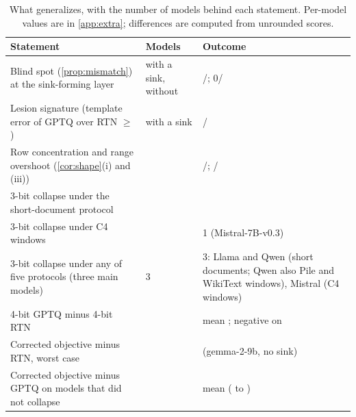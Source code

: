 \begin{table}[t]
\caption{What generalizes, with the number of models behind each statement. Per-model values are in \cref{app:extra}; differences are computed from unrounded scores.}
\label{tab:census}
\begin{center}
\small
\footnotesize\begin{tabular}{p{6.2cm}p{2.6cm}p{4.2cm}}
\toprule
Statement & Models & Outcome \\
\midrule
Blind spot (\cref{prop:mismatch}) at the sink-forming layer & \nSink{} with a sink, \nNoSink{} without & \nSink{}/\nSink{}; 0/\nNoSink{} \\
Lesion signature (template error of GPTQ over RTN $\ge$ \LesionRatioMin{}) & \nSinkStats{} with a sink & \nSinkStats{}/\nSinkStats{} \\
Row concentration and range overshoot (\cref{cor:shape}(i) and (iii)) & \nSinkStats{} & \nRowConc{}/\nSinkStats{}; \nClipOver{}/\nSinkStats{} \\
3-bit collapse under the short-document protocol            & \nCensus{}  & \nCollapse{} \\
3-bit collapse under C4 windows                              & \nWin{}     & 1 (Mistral-7B-v0.3) \\
3-bit collapse under any of five protocols (three main models) & 3 & 3: Llama and Qwen (short documents; Qwen also Pile and WikiText windows), Mistral (C4 windows) \\
4-bit GPTQ minus 4-bit RTN                                   & \nFour{}    & mean \FourMeanDelta{}; negative on \FourNegFrac{} \\
Corrected objective minus RTN, worst case                    & \nCorr{}    & \CorrWorstVsRTN{} (gemma-2-9b, no sink) \\
Corrected objective minus GPTQ on models that did not collapse & \nHealthy{} & mean \CorrHealthyMean{} (\CorrHealthyWorst{} to \CorrHealthyBest{}) \\
\bottomrule
\end{tabular}
\end{center}
\end{table}
